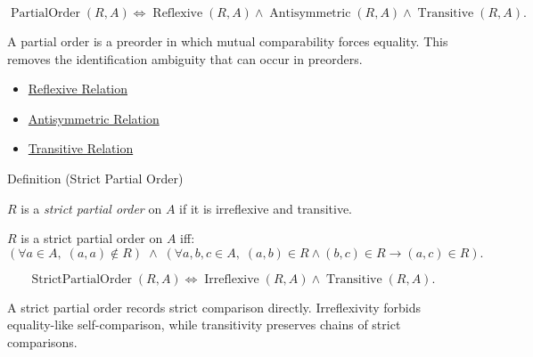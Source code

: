 \begin{remark*}
\[
  \operatorname{PartialOrder}(R,A)
  \iff
  \operatorname{Reflexive}(R,A)
  \wedge \operatorname{Antisymmetric}(R,A)
  \wedge \operatorname{Transitive}(R,A).
\]
\end{remark*}

\begin{remark*}[Interpretation]
A partial order is a preorder in which mutual comparability forces equality.
This removes the identification ambiguity that can occur in preorders.
\end{remark*}

\begin{dependencies}
\begin{itemize}
  \item \hyperref[def:reflexive]{Reflexive Relation}
  \item \hyperref[def:antisymmetric]{Antisymmetric Relation}
  \item \hyperref[def:transitive]{Transitive Relation}
\end{itemize}
\end{dependencies}

\begin{definitionbox}{Definition (Strict Partial Order)}
\begin{definition}\label{def:strict-partial-order-relations}
$R$ is a \emph{strict partial order} on $A$ if it is irreflexive and
transitive.
\end{definition}
\end{definitionbox}

\begin{remark*}
$R$ is a strict partial order on $A$ iff:
\[
(\forall a \in A,\; (a,a)\notin R)\;\wedge\;
(\forall a,b,c \in A,\; (a,b)\in R \wedge (b,c)\in R \to (a,c)\in R).
\]
\end{remark*}

\begin{remark*}
\[
  \operatorname{StrictPartialOrder}(R,A)
  \iff
  \operatorname{Irreflexive}(R,A)
  \wedge \operatorname{Transitive}(R,A).
\]
\end{remark*}

\begin{remark*}[Interpretation]
A strict partial order records strict comparison directly. Irreflexivity
forbids equality-like self-comparison, while transitivity preserves chains of
strict comparisons.
\end{remark*}

